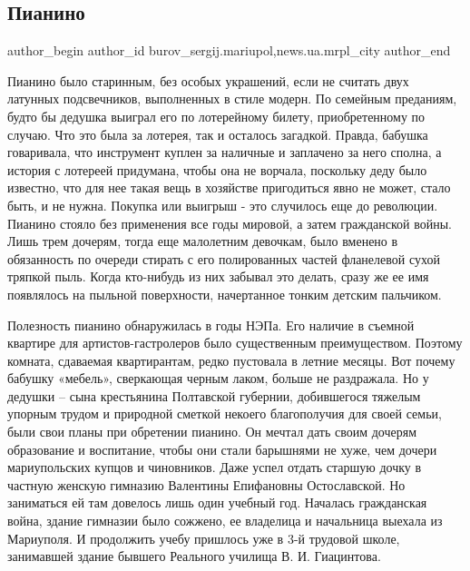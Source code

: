  
 
 
 
 
 
\subsection{Пианино}
\label{sec:25_11_2017.stz.news.ua.mrpl_city.1.pianino}
 
\ifcmt
 author_begin
   author_id burov_sergij.mariupol,news.ua.mrpl_city
 author_end
\fi

Пианино было старинным, без особых украшений, если не считать двух латунных
подсвечников, выполненных в стиле модерн. По семейным преданиям, будто бы
дедушка выиграл его по лотерейному билету, приобретенному по случаю. Что это
была за лотерея, так и осталось загадкой. Правда, бабушка говаривала, что
инструмент куплен за наличные и заплачено за него сполна, а история с лотереей
придумана, чтобы она не ворчала, поскольку деду было известно, что для нее
такая вещь в хозяйстве пригодиться явно не может, стало быть, и не нужна.
Покупка или выигрыш - это случилось еще до революции. Пианино стояло без
применения все годы мировой, а затем гражданской войны. Лишь трем дочерям,
тогда еще малолетним девочкам, было вменено в обязанность по очереди стирать с
его полированных частей фланелевой сухой тряпкой пыль. Когда кто-нибудь из них
забывал это делать, сразу же ее имя появлялось на пыльной поверхности,
начертанное тонким детским пальчиком.

Полезность пианино обнаружилась в годы НЭПа. Его наличие в съемной квартире для
артистов-гастролеров было существенным преимуществом. Поэтому комната,
сдаваемая квартирантам, редко пустовала в летние месяцы. Вот почему бабушку
«мебель», сверкающая черным лаком, больше  не раздражала. Но у дедушки – сына
крестьянина Полтавской губернии, добившегося тяжелым упорным трудом и природной
сметкой некоего благополучия для своей семьи, были свои планы при обретении
пианино. Он мечтал дать своим дочерям образование и воспитание, чтобы они стали
барышнями не хуже, чем дочери мариупольских купцов и чиновников. Даже успел
отдать старшую дочку в частную женскую гимназию Валентины Епифановны
Остославской. Но заниматься ей там довелось лишь один учебный год. Началась
гражданская война, здание гимназии было сожжено, ее владелица и начальница
выехала из Мариуполя. И продолжить учебу пришлось уже в 3-й трудовой школе,
занимавшей здание бывшего Реального училища В. И. Гиацинтова.

